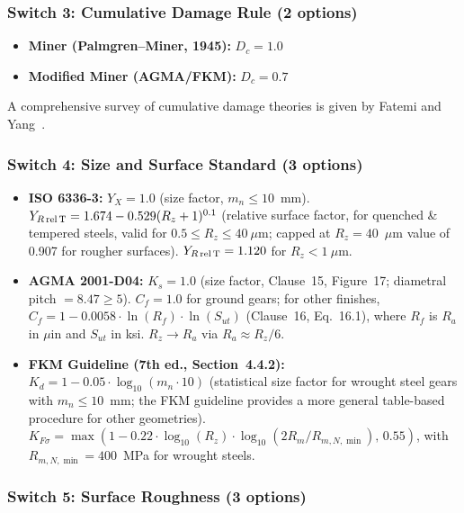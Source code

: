 \documentclass[twocolumn,12pt,a4paper]{article}
\begin{document}
\subsubsection{Switch 3: Cumulative Damage Rule (2 options)}

\begin{itemize}
  \item \textbf{Miner (Palmgren--Miner, 1945):} $D_c = 1.0$
  \item \textbf{Modified Miner (AGMA/FKM):} $D_c = 0.7$
\end{itemize}
A comprehensive survey of cumulative damage theories is given by Fatemi and Yang~\cite{fatemi1998}.

\subsubsection{Switch 4: Size and Surface Standard (3 options)}

\begin{itemize}
  \item \textbf{ISO 6336-3:} $Y_X = 1.0$ (size factor, $m_n \leq 10$~mm).
        $Y_{R\,\rm rel\,T} = 1.674 - 0.529(R_z+1)^{0.1}$ (relative
        surface factor, for quenched \& tempered steels, valid for
        $0.5 \leq R_z \leq 40~\mu$m; capped at $R_z=40$~$\mu$m value
        of 0.907 for rougher surfaces). $Y_{R\,\rm rel\,T} = 1.120$
        for $R_z < 1~\mu$m.
  \item \textbf{AGMA 2001-D04:} $K_s = 1.0$ (size factor, Clause~15,
        Figure~17; diametral pitch $=8.47 \geq 5$).
        $C_f = 1.0$ for ground gears; for other finishes,
        $C_f = 1 - 0.0058 \cdot \ln(R_f) \cdot \ln(S_{ut})$
        (Clause~16, Eq.~16.1), where $R_f$ is $R_a$ in $\mu$in
        and $S_{ut}$ in ksi. $R_z \rightarrow R_a$ via
        $R_a \approx R_z/6$.
  \item \textbf{FKM Guideline (7th ed., Section~4.4.2):}
        $K_d = 1 - 0.05 \cdot \log_{10}(m_n \cdot 10)$ (statistical size
        factor for wrought steel gears with $m_n \leq 10$~mm;
        the FKM guideline provides a more general table-based procedure
        for other geometries).
        $K_{F\sigma} = \max(1 - 0.22 \cdot \log_{10}(R_z) \cdot
        \log_{10}(2R_m/R_{m,N,\min}),\, 0.55)$, with
        $R_{m,N,\min}=400$~MPa for wrought steels.
\end{itemize}

\subsubsection{Switch 5: Surface Roughness (3 options)}
\end{document}
